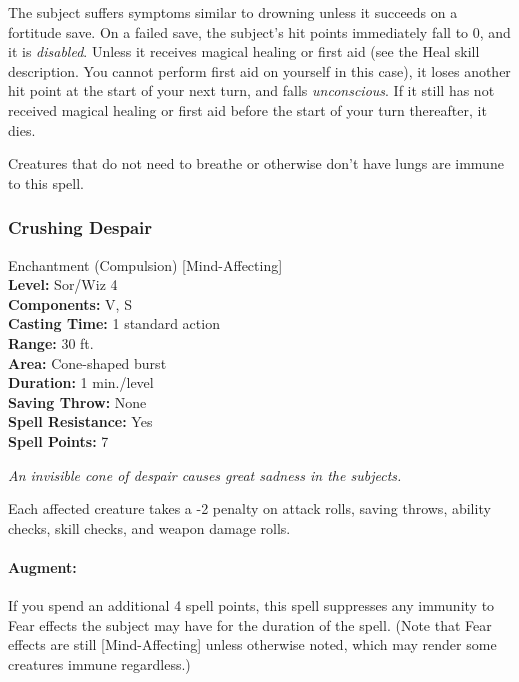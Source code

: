 The subject suffers symptoms similar to drowning unless it succeeds on a fortitude save.
On a failed save, the subject's hit points immediately fall to 0, and it is \emph{disabled}.
Unless it receives magical healing or first aid (see the Heal skill description. You cannot perform first aid on yourself in this case), it loses another hit point at the start of your next turn, and falls \emph{unconscious}. If it still has not received magical healing or first aid before the start of your turn thereafter, it dies.

Creatures that do not need to breathe or otherwise don't have lungs are immune to this spell.

\subsubsection{Crushing Despair}
\label{Spell:CrushingDespair}
Enchantment (Compulsion) [Mind-Affecting]
\\ \textbf{Level:} Sor/Wiz 4
\\ \textbf{Components:} V, S
\\ \textbf{Casting Time:} 1 standard action
\\ \textbf{Range:} 30 ft.
\\ \textbf{Area:} Cone-shaped burst
\\ \textbf{Duration:} 1 min./level
\\ \textbf{Saving Throw:} None
\\ \textbf{Spell Resistance:} Yes
\\ \textbf{Spell Points:} 7

\emph{An invisible cone of despair causes great sadness in the subjects.}

Each affected creature takes a -2 penalty on attack rolls, saving throws, ability checks, skill checks, and weapon damage rolls.

\paragraph{Augment:} If you spend an additional 4 spell points, 
this spell suppresses any immunity to Fear effects the subject may have for the duration of the spell.
(Note that Fear effects are still [Mind-Affecting] unless otherwise noted, which may render some creatures immune regardless.)
